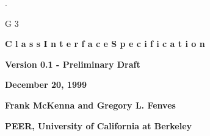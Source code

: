 



\def\A{\mathop{\mbox{\huge \rm A}}\limits}
\def\I{\mathop{\cal {\bf I}}}
\def\U{{\bf U}}
\def\Ud{  \dot{\bf U}}
\def\Udd{  \ddot{\bf U}}
\def\F{{\bf F}}
\def\R{{\bf R}}
\def\K{{\bf K}}
\def\P{{\bf P}}
\def\B{{\bf B}}
\def\M{{\bf M}}
\def\f{{\bf F}}
\def\C{{\bf C}}
\def\D{{\bf D}}
\def\T{{\bf T}}
\def\X{{\bf X}}
\def\Q{{\bf Q}}
\def\V{{\bf V}}
\def\mylambda{{\bf \lambda}}
\def\myLambda{{\bf \Lambda}}
\def\myalpha{{\bf \alpha}}


\def\myPhi{{\bf \Phi}}
\def\zero{{\bf 0}}

\begin{titlepage}
{.}\vspace{2.0in}
\begin{center}

{\Huge G 3}

\vspace{0.5in}
{\bf {\Large C l a s s \hspace{0.1in} I n t e r f a c e  \hspace{0.1in} S p
e c i f i c a t i o n} }

\vspace{1.0in}
{\bf Version 0.1 - Preliminary Draft} 

\vspace{1.0in}
{\bf  December 20, 1999} 

\vspace{1.0in}
{\bf  Frank McKenna and Gregory L. Fenves} 

{\bf  PEER, University of California at Berkeley}

\end{center}
\end{titlepage}

